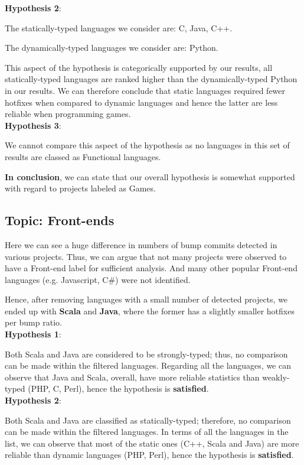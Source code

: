 \textbf{Hypothesis 2}:\par

The statically-typed languages we consider are: C, Java, C++.\par
The dynamically-typed languages we consider are: Python.\par

This aspect of the hypothesis is categorically supported by our results, all statically-typed languages are ranked higher than the dynamically-typed Python in our results. We can therefore conclude that static languages required fewer hotfixes when compared to dynamic languages and hence the latter are less reliable when programming games.\\

\textbf{Hypothesis 3}:\par
We cannot compare this aspect of the hypothesis as no languages in this set of results are classed as Functional languages.\par

\textbf{In conclusion}, we can state that our overall hypothesis is somewhat supported with regard to projects labeled as Games.

\subsection{Topic: Front-ends}
Here we can see a huge difference in numbers of bump commits detected in various projects. Thus, we can argue that not many projects were observed to have a Front-end label for sufficient analysis. And many other popular Front-end languages (e.g. Javascript, C\#) were not identified.\par
Hence, after removing languages with a small number of detected projects, we ended up with \textbf{Scala} and \textbf{Java}, where the former has a slightly smaller hotfixes per bump ratio.\\

\textbf{Hypothesis 1}:\par
Both Scala and Java are considered to be strongly-typed; thus, no comparison can be made within the filtered languages. 
Regarding all the languages, we can observe that Java and Scala, overall, have more reliable statistics than weakly-typed (PHP, C, Perl), hence the hypothesis is \textbf{satisfied}.\\

\textbf{Hypothesis 2}:\par
Both Scala and Java are classified as statically-typed; therefore, no comparison can be made within the filtered languages. In terms of all the languages in the list, we can observe that most of the static ones (C++, Scala and Java) are more reliable than dynamic languages (PHP, Perl), hence the hypothesis is \textbf{satisfied}.\\

